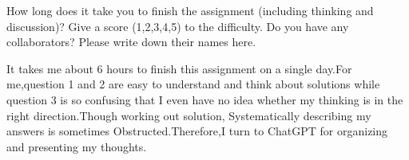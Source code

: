 \documentclass{oxmathproblems}
\begin{document}
\begin{questions}
\miquestion
How long does it take you to finish the assignment (including thinking and discussion)?
Give a score (1,2,3,4,5) to the difficulty.
Do you have any collaborators?
Please write down their names here.
 
It takes me about 6 hours to finish this assignment on a single day.For me,question 1 and 2 are easy to understand and think about solutions while question 3 is so confusing that I even have no idea whether my thinking is in the right direction.Though working out solution, Systematically describing my answers is sometimes Obstructed.Therefore,I turn to ChatGPT for organizing and presenting my thoughts.
\end{questions}
\end{document}
